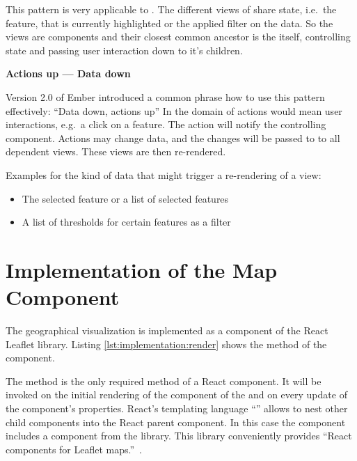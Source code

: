 This pattern is very applicable to \cmvs{}.
The different views of \cmvs{} share state, i.e.\ the feature, that is currently highlighted or the applied filter on the data.
So the views are components and their closest common ancestor is the \cmv{} itself, controlling state and passing user interaction down to it's children.

\textbf{Actions up --- Data down}

Version 2.0 of Ember introduced a common phrase how to use this pattern effectively: ``Data down, actions up''\cite{Emberigniter2017}
In the domain of \cmvs{} actions would mean user interactions, e.g.\ a click on a feature.
The action will notify the controlling \cmv{} component.
Actions may change data, and the changes will be passed to to all dependent views.
These views are then re-rendered.

Examples for the kind of data that might trigger a re-rendering of a view:
\begin{itemize}
  \item
    The selected feature or a list of selected features
  \item
    A list of thresholds for certain features as a filter
\end{itemize}


\section{Implementation of the Map Component}

The geographical visualization is implemented as a  component of the React Leaflet library.
Listing \ref{lst:implementation:render} shows the  method of the component.



The  method is the only required method of a React component.
It will be invoked on the initial rendering of the component of the  and on every update of the component's properties.
React's templating language ``'' allows to nest other child components into the React parent component.
In this case the  component includes a   component from the  library.
This library conveniently provides ``React components for Leaflet maps.''~\cite{ReactLeaflet2017}.

